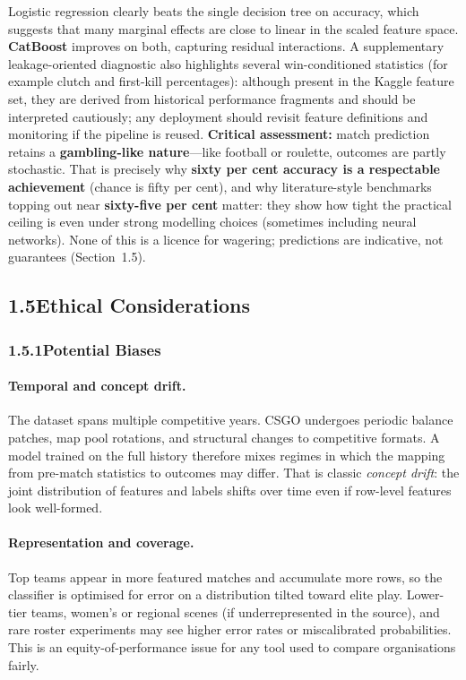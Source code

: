 \documentclass[12pt,a4paper]{article}
\begin{document}
Logistic regression clearly beats the single decision tree on accuracy, which suggests that many marginal effects are close to linear in the scaled feature space. \textbf{CatBoost} improves on both, capturing residual interactions. A supplementary leakage-oriented diagnostic also highlights several win-conditioned statistics (for example clutch and first-kill percentages): although present in the Kaggle feature set, they are derived from historical performance fragments and should be interpreted cautiously; any deployment should revisit feature definitions and monitoring if the pipeline is reused. \textbf{Critical assessment:} match prediction retains a \textbf{gambling-like nature}---like football or roulette, outcomes are partly stochastic. That is precisely why \textbf{sixty per cent accuracy is a respectable achievement} (chance is fifty per cent), and why literature-style benchmarks topping out near \textbf{sixty-five per cent} matter: they show how tight the practical ceiling is even under strong modelling choices (sometimes including neural networks). None of this is a licence for wagering; predictions are indicative, not guarantees (Section~1.5).

\subsection{1.5\quad Ethical Considerations}

\subsubsection{1.5.1\quad Potential Biases}

\paragraph{Temporal and concept drift.}
The dataset spans multiple competitive years. CSGO undergoes periodic balance patches, map pool rotations, and structural changes to competitive formats. A model trained on the full history therefore mixes regimes in which the mapping from pre-match statistics to outcomes may differ. That is classic \textit{concept drift}: the joint distribution of features and labels shifts over time even if row-level features look well-formed.

\paragraph{Representation and coverage.}
Top teams appear in more featured matches and accumulate more rows, so the classifier is optimised for error on a distribution tilted toward elite play. Lower-tier teams, women's or regional scenes (if underrepresented in the source), and rare roster experiments may see higher error rates or miscalibrated probabilities. This is an equity-of-performance issue for any tool used to compare organisations fairly.
\end{document}

